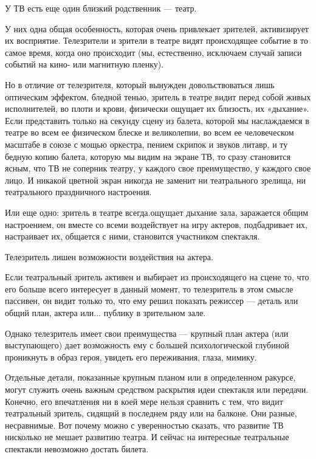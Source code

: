 \documentclass[12pt, a4paper, openany]{book}
\begin{document}
У ТВ есть еще один близкий родственник — театр. 

У них одна общая особенность, которая очень привлекает зрителей, активизирует их восприятие. Телезрители и зрители в театре видят происходящее событие в то самое время, когда оно происходит (мы, естественно, исключаем случай записи событий на кино- или магнитную пленку). 

Но в отличие от телезрителя, который вынужден довольствоваться лишь оптическим эффектом, бледной тенью, зритель в театре видит перед собой живых исполнителей, во плоти и крови, физически ощущает их близость, их «дыхание». Если представить только на секунду сцену из балета, которой мы наслаждаемся в театре во всем ее физическом блеске и великолепии, во всем ее человеческом масштабе в союзе с мощью оркестра, пением скрипок и звуков литавр, и ту бедную копию балета, которую мы видим на экране ТВ, то сразу становится ясным, что ТВ не соперник театру, у каждого свое преимущество, у каждого свое лицо. И никакой цветной экран никогда не заменит ни театрального зрелища, ни театрального праздничного настроения. 

Или еще одно: зритель в театре всегда.ощущает дыхание зала, заражается общим настроением, он вместе со всеми воздействует на игру актеров, подбадривает их, настраивает их, общается с ними, становится участником спектакля. 

Телезритель лишен возможности воздействия на актера. 

Если театральный зритель активен и выбирает из происходящего на сцене то, что его больше всего интересует в данный момент, то телезритель в этом смысле пассивен, он видит только то, что ему решил показать режиссер — деталь или общий план, актера или... публику в зрительном зале. 

Однако телезритель имеет свои преимущества — крупный план актера (или выступающего) дает возможность ему с большей психологической глубиной проникнуть в образ героя, увидеть его переживания, глаза, мимику. 

Отдельные детали, показанные крупным планом или в определенном ракурсе, могут служить очень важным средством раскрытия идеи спектакля или передачи. Конечно, его впечатления ни в коей мере нельзя сравнить с тем, что видит театральный зритель, сидящий в последнем ряду или на балконе. Они разные, несравнимые. Вот почему можно с уверенностью сказать, что развитие ТВ нисколько не мешает развитию театра. И сейчас на интересные театральные спектакли невозможно достать билета. 
\end{document}
